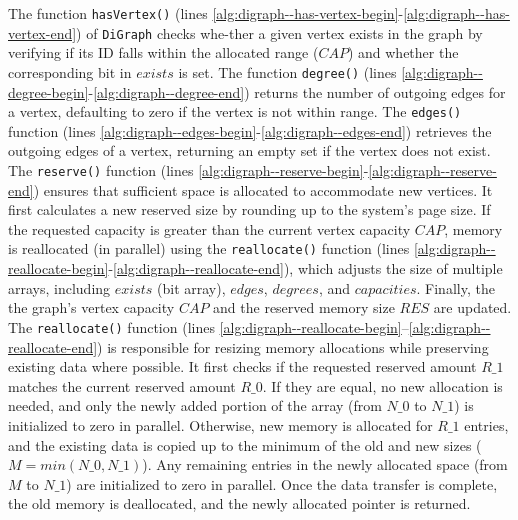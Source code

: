 The function \texttt{hasVertex()} (lines \ref{alg:digraph--has-vertex-begin}-\ref{alg:digraph--has-vertex-end}) of \texttt{DiGraph} checks whe-ther a given vertex exists in the graph by verifying if its ID falls within the allocated range ($CAP$) and whether the corresponding bit in $exists$ is set. The function \texttt{degree()} (lines \ref{alg:digraph--degree-begin}-\ref{alg:digraph--degree-end}) returns the number of outgoing edges for a vertex, defaulting to zero if the vertex is not within range. The \texttt{edges()} function (lines \ref{alg:digraph--edges-begin}-\ref{alg:digraph--edges-end}) retrieves the outgoing edges of a vertex, returning an empty set if the vertex does not exist.
%
The \texttt{reserve()} function (lines \ref{alg:digraph--reserve-begin}-\ref{alg:digraph--reserve-end}) ensures that sufficient space is allocated to accommodate new vertices. It first calculates a new reserved size by rounding up to the system's page size. If the requested capacity is greater than the current vertex capacity $CAP$, memory is reallocated (in parallel) using the \texttt{reallocate()} function (lines \ref{alg:digraph--reallocate-begin}-\ref{alg:digraph--reallocate-end}), which adjusts the size of multiple arrays, including $exists$ (bit array), $edges$, $degrees$, and $capacities$. Finally, the the graph’s vertex capacity $CAP$ and the reserved memory size $RES$ are updated.
%
The \texttt{reallocate()} function (lines \ref{alg:digraph--reallocate-begin}–\ref{alg:digraph--reallocate-end}) is responsible for resizing memory allocations while preserving existing data where possible. It first checks if the requested reserved amount $R\_1$ matches the current reserved amount $R\_0$. If they are equal, no new allocation is needed, and only the newly added portion of the array (from $N\_0$ to $N\_1$) is initialized to zero in parallel. Otherwise, new memory is allocated for $R\_1$ entries, and the existing data is copied up to the minimum of the old and new sizes ($M = min(N\_0, N\_1)$). Any remaining entries in the newly allocated space (from $M$ to $N\_1$) are initialized to zero in parallel. Once the data transfer is complete, the old memory is deallocated, and the newly allocated pointer is returned.


